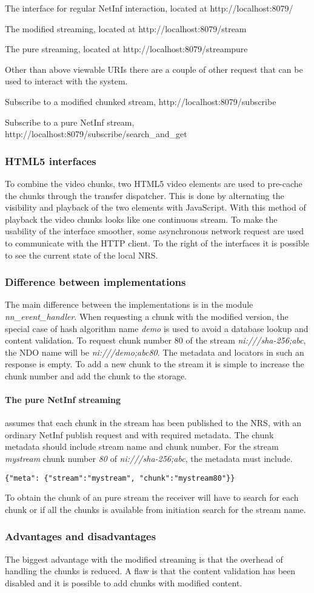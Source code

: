 The interface for regular NetInf interaction, located at 
http://localhost:8079/

The modified streaming, located at
http://localhost:8079/stream

The pure streaming, located at
http://localhost:8079/streampure

Other than above viewable URIs there are a couple of other request that can be used to interact with the system. 

Subscribe to a modified chunked stream, http://localhost:8079/subscribe

Subscribe to a pure NetInf stream, http://localhost:8079/subscribe/search\_and\_get


\subsubsection{HTML5 interfaces}
To combine the video chunks, two HTML5 video elements are used to pre-cache the chunks through the transfer dispatcher. This is done by alternating the visibility and playback of the two elements with JavaScript. With this method of playback the video chunks looks like one continuous stream. 
To make the usability of the interface smoother, some asynchronous network request are used to communicate with the HTTP client.
To the right of the interfaces it is possible to see the current state of the local NRS. 

\subsubsection{Difference between implementations}
The main difference between the implementations is in the module \textit{nn\_event\_handler}. When requesting a chunk with the modified version, the special case of hash algorithm name \textit{demo} is used to avoid a database lookup and content validation. To request chunk number 80 of the stream \textit{ni:///sha-256;abc}, the NDO name will be \textit{ni:///demo;abc80}. The metadata and locators in such an response is empty. To add a new chunk to the stream it is simple to increase the chunk number and add the chunk to the storage. 
\paragraph{The pure NetInf streaming} assumes that each chunk in the stream has been published to the NRS, with an ordinary NetInf publish request and with required metadata. The chunk metadata should include stream name and chunk number. For the stream \textit{mystream} chunk number \textit{80} of \textit{ni:///sha-256;abc}, the metadata must include. 
\begin{verbatim}
{"meta": {"stream":"mystream", "chunk":"mystream80"}}
\end{verbatim}
To obtain the chunk of an pure stream the receiver will have to search for each chunk or if all the chunks is available from initiation search for the stream name.

\subsubsection{Advantages and disadvantages}
The biggest advantage with the modified streaming is that the overhead of handling the chunks is reduced. A flaw is that the content validation has been disabled and it is possible to add chunks with modified content. 